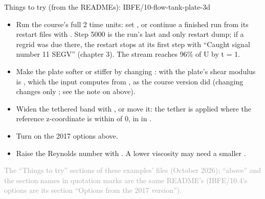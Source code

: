 \documentclass[aspectratio=169,11pt]{beamer}
\newcommand{\sourcecredit}[1]{\vfill\begin{flushright}\tiny\textcolor{DarkGray}{#1}\end{flushright}}
\begin{document}
\begin{frame}{Things to try (from the READMEs): IBFE/10-flow-tank-plate-3d}
\scriptsize\setlength{\leftmargini}{5em}
\begin{itemize}\setlength{\itemsep}{1pt}
  \item[IBFE/10.1] Run the course's full 2 time units: set , or continue a finished run from its restart files with . Step 5000 is the run's last and only restart dump; if a regrid was due there, the restart stops at its first step with ``Caught signal number 11 SEGV'' (chapter 3). The stream reaches 96\% of U by t = 1.
  \item[IBFE/10.2] Make the plate softer or stiffer by changing : with  the plate's shear modulus is , which the input computes from , as the course version did (changing  changes only ; see the note on  above).
  \item[IBFE/10.3] Widen the tethered band with , or move it: the tether is applied where the reference z-coordinate is within  of 0, in  in .
  \item[IBFE/10.4] Turn on the 2017 options above.
  \item[IBFE/10.5] Raise the Reynolds number with . A lower viscosity may need a smaller .
\end{itemize}
\sourcecredit{The ``Things to try'' sections of these examples' \code{README.md} files (October 2026); ``above'' and the section names in quotation marks are the same README's (IBFE/10.4's options are its section ``Options from the 2017 version'').}
\end{frame}
\end{document}
